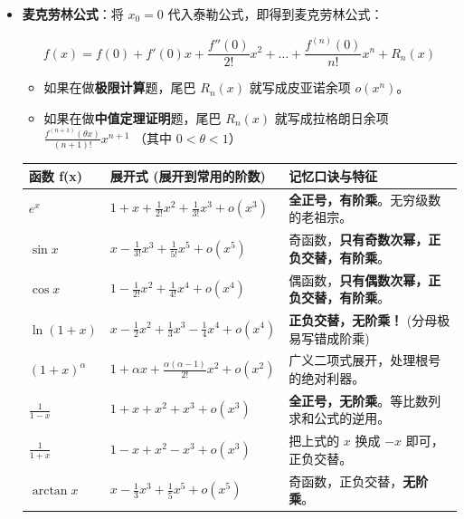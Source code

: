 \documentclass[
]{article}
\newcounter{none} %
\begin{document}
\begin{itemize}
\item
  \textbf{麦克劳林公式}：将 \(x_0 = 0\)
  代入泰勒公式，即得到麦克劳林公式：

  \[f(x) = f(0) + f'(0)x + \frac{f''(0)}{2!}x^2 + \dots + \frac{f^{(n)}(0)}{n!}x^n + R_n(x)\]

  \begin{itemize}
  \item
    如果在做\textbf{极限计算}题，尾巴 \(R_n(x)\) 就写成皮亚诺余项
    \(o(x^n)\)。
  \item
    如果在做\textbf{中值定理证明}题，尾巴 \(R_n(x)\) 就写成拉格朗日余项
    \(\frac{f^{(n+1)}(\theta x)}{(n+1)!}x^{n+1}\) （其中
    \(0 < \theta < 1\)）
  \end{itemize}

  {\def\LTcaptype{none} %
  \begin{longtable}[]{@{}lll@{}}
  \toprule\noalign{}
  \textbf{函数 f(x)} & \textbf{展开式 (展开到常用的阶数)} &
  \textbf{记忆口诀与特征} \\
  \midrule\noalign{}
  \endhead
  \bottomrule\noalign{}
  \endlastfoot
  \textbf{\(e^x\)} &
  \(1 + x + \frac{1}{2!}x^2 + \frac{1}{3!}x^3 + o(x^3)\) &
  \textbf{全正号，有阶乘}。无穷级数的老祖宗。 \\
  \textbf{\(\sin x\)} &
  \(x - \frac{1}{3!}x^3 + \frac{1}{5!}x^5 + o(x^5)\) &
  奇函数，\textbf{只有奇数次幂，正负交替，有阶乘}。 \\
  \textbf{\(\cos x\)} &
  \(1 - \frac{1}{2!}x^2 + \frac{1}{4!}x^4 + o(x^4)\) &
  偶函数，\textbf{只有偶数次幂，正负交替，有阶乘}。 \\
  \textbf{\(\ln(1+x)\)} &
  \(x - \frac{1}{2}x^2 + \frac{1}{3}x^3 - \frac{1}{4}x^4 + o(x^4)\) &
  \textbf{正负交替，无阶乘！} (分母极易写错成阶乘) \\
  \textbf{\((1+x)^\alpha\)} &
  \(1 + \alpha x + \frac{\alpha(\alpha-1)}{2!}x^2 + o(x^2)\) &
  广义二项式展开，处理根号的绝对利器。 \\
  \textbf{\(\frac{1}{1-x}\)} & \(1 + x + x^2 + x^3 + o(x^3)\) &
  \textbf{全正号，无阶乘}。等比数列求和公式的逆用。 \\
  \textbf{\(\frac{1}{1+x}\)} & \(1 - x + x^2 - x^3 + o(x^3)\) & 把上式的
  \(x\) 换成 \(-x\) 即可，正负交替。 \\
  \textbf{\(\arctan x\)} &
  \(x - \frac{1}{3}x^3 + \frac{1}{5}x^5 + o(x^5)\) &
  奇函数，正负交替，\textbf{无阶乘}。 \\
  \end{longtable}
  }
\end{itemize}
\end{document}
